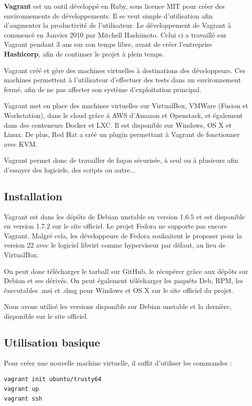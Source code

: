 \documentclass[12pt,a4paper]{article}
\begin{document}
\textbf{Vagrant} est un outil développé en Ruby, sous licence MIT pour créer des environnements de développements. Il se veut simple d'utilisation afin d'augmenter la productivité de l'utilisateur. Le développement de Vagrant à commencé en Janvier 2010 par Mitchell Hashimoto. Celui ci a travaillé sur Vagrant pendant 3 ans sur son temps libre, avant de créer l'entreprise \textbf{Hashicorp}, afin de continuer le projet à plein temps.

Vagrant créé et gère des machines virtuelles à destinations des développeurs. Ces machines permettent à l'utilisateur d'effectuer des tests dans un environnement fermé, afin de ne pas affecter son système d'exploitation principal. 

Vagrant met en place des machines virtuelles sur VirtualBox, VMWare (Fusion et Workstation), dans le cloud grâce à AWS d'Amazon et Openstack, et également dans des conteneurs Docker et LXC. Il est disponible sur Windows, OS X et Linux. De plus, Red Hat a créé un plugin permettant à Vagrant de fonctionner avec KVM.

Vagrant permet donc de travailler de façon sécurisée, à seul ou à plusieurs afin d'essayer des logiciels, des scripts ou autre...

\subsection{Installation}
Vagrant est dans les dépôts de Debian unstable en version 1.6.5 et est disponible en version 1.7.2 sur le site officiel. Le projet Fedora ne supporte pas encore Vagrant. Malgré cela, les développeurs de Fedora souhaitent le proposer pour la version 22 avec le logiciel libvirt comme hyperviseur par défaut, au lieu de VirtualBox.

On peut donc télécharger le tarball sur GitHub, le récupérer grâce aux dépôts sur Debian et ses dérivés. On peut également télécharger les paquêts Deb, RPM, les éxecutables .msi et .dmg pour Windows et OS X sur le site officiel du projet.

Nous avons utilisé les versions disponible sur Debian unstable et la dernière, disponible sur le site officiel.

\subsection{Utilisation basique}

Pour créer une nouvelle machine virtuelle, il suffit d'utiliser les commandes :
\begin{lstlisting}
vagrant init ubuntu/trusty64
vagrant up
vagrant ssh
\end{lstlisting}
\end{document}
